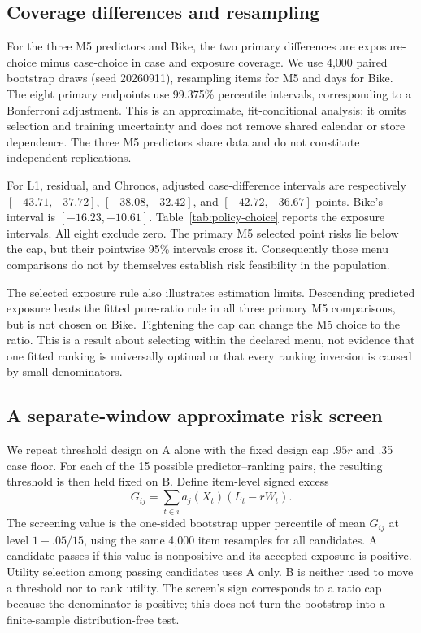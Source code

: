 

\subsection{Coverage differences and resampling}
For the three M5 predictors and Bike, the two primary differences are exposure-choice minus case-choice in case and exposure coverage. We use 4,000 paired bootstrap draws (seed 20260911), resampling items for M5 and days for Bike. The eight primary endpoints use 99.375\% percentile intervals, corresponding to a Bonferroni adjustment. This is an approximate, fit-conditional analysis: it omits selection and training uncertainty and does not remove shared calendar or store dependence. The three M5 predictors share data and do not constitute independent replications.

For L1, residual, and Chronos, adjusted case-difference intervals are respectively $[-43.71,-37.72]$, $[-38.08,-32.42]$, and $[-42.72,-36.67]$ points. Bike's interval is $[-16.23,-10.61]$. Table~\ref{tab:policy-choice} reports the exposure intervals. All eight exclude zero. The primary M5 selected point risks lie below the cap, but their pointwise 95\% intervals cross it. Consequently those menu comparisons do not by themselves establish risk feasibility in the population.

The selected exposure rule also illustrates estimation limits. Descending predicted exposure beats the fitted pure-ratio rule in all three primary M5 comparisons, but is not chosen on Bike. Tightening the cap can change the M5 choice to the ratio. This is a result about selecting within the declared menu, not evidence that one fitted ranking is universally optimal or that every ranking inversion is caused by small denominators.

\subsection{A separate-window approximate risk screen}
We repeat threshold design on A alone with the fixed design cap $.95r$ and .35 case floor. For each of the 15 possible predictor--ranking pairs, the resulting threshold is then held fixed on B. Define item-level signed excess
\[
 G_{ij}=\sum_{t\in i}a_j(X_t)(L_t-rW_t).
\]
The screening value is the one-sided bootstrap upper percentile of mean $G_{ij}$ at level $1-.05/15$, using the same 4,000 item resamples for all candidates. A candidate passes if this value is nonpositive and its accepted exposure is positive. Utility selection among passing candidates uses A only. B is neither used to move a threshold nor to rank utility. The screen's sign corresponds to a ratio cap because the denominator is positive; this does not turn the bootstrap into a finite-sample distribution-free test.

